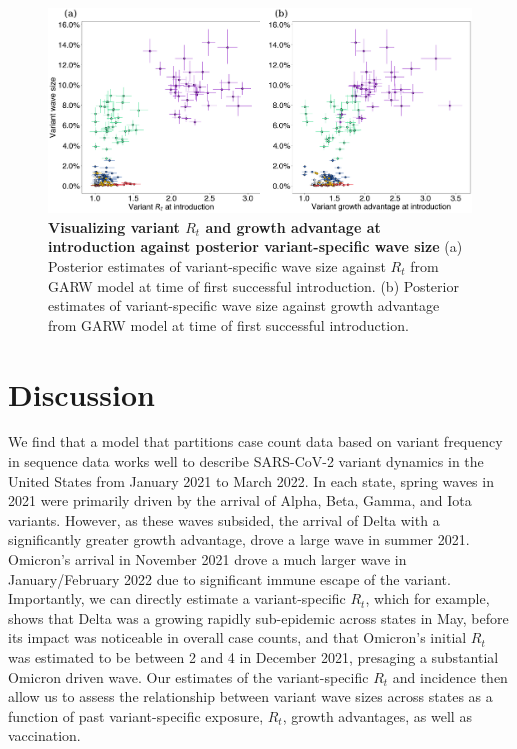 \documentclass[11pt,oneside,letterpaper]{article}
\begin{document}
\begin{figure}[h!]
  \centering
  \includegraphics[width=\linewidth]{figs/intro_R_to_wave_size.png}
  \caption{\textbf{Visualizing variant $R_{t}$ and growth advantage at introduction against posterior variant-specific wave size}
      (a) Posterior estimates of variant-specific wave size against $R_{t}$ from GARW model at time of first successful introduction.
      (b) Posterior estimates of variant-specific wave size against growth advantage from GARW model at time of first successful introduction.
  }
  \label{fig:intro_R_to_wave_size}
\end{figure}

\section*{Discussion}

We find that a model that partitions case count data based on variant frequency in sequence data works well to describe SARS-CoV-2 variant dynamics in the United States from January 2021 to March 2022.
In each state, spring waves in 2021 were primarily driven by the arrival of Alpha, Beta, Gamma, and Iota variants.
However, as these waves subsided, the arrival of Delta with a significantly greater growth advantage, drove a large wave in summer 2021.
Omicron's arrival in November 2021 drove a much larger wave in January/February 2022 due to significant immune escape of the variant.
Importantly, we can directly estimate a variant-specific $R_{t}$, which for example, shows that Delta was a growing rapidly sub-epidemic across states in May, before its impact was noticeable in overall case counts, and that Omicron's initial $R_{t}$ was estimated to be between 2 and 4 in December 2021, presaging a substantial Omicron driven wave.
Our estimates of the variant-specific $R_{t}$ and incidence then allow us to assess the relationship between variant wave sizes across states as a function of past variant-specific exposure, $R_{t}$, growth advantages, as well as vaccination.
\end{document}
